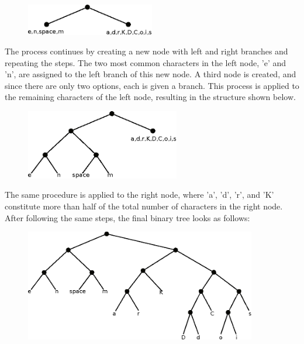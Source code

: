 \documentclass[book.tex]{subfiles}
\begin{document}
\begin{figure}[H]
\centering
 \includegraphics[width=0.5\textwidth]{imgs/drawings/huffman_tree_1.eps}
 \end{figure}

 \par
The process continues by creating a new node with left and right branches and repeating the steps. The two most common characters in the left node, 'e' and 'n', are assigned to the left branch of this new node. A third node is created, and since there are only two options, each is given a branch. This process is applied to the remaining characters of the left node, resulting in the structure shown below. \\

\begin{figure}[H]
\centering
 \includegraphics[width=0.6\textwidth]{imgs/drawings/huffman_tree_2.eps}
 \end{figure}

 \par
The same procedure is applied to the right node, where 'a', 'd', 'r', and 'K' constitute more than half of the total number of characters in the right node. After following the same steps, the final binary tree looks as follows:\\
 
\begin{figure}[H]
\centering
 \includegraphics[width=0.9\textwidth]{imgs/drawings/huffman_tree_3.eps}
 \end{figure}
\end{document}
